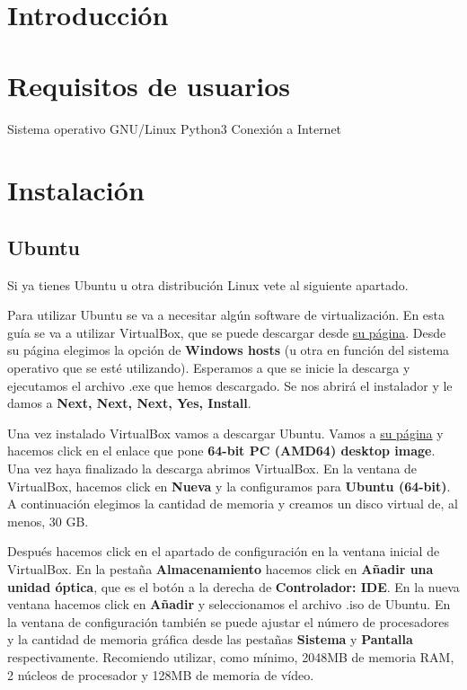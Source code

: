 
\section{Introducción}

\section{Requisitos de usuarios}

Sistema operativo GNU/Linux
Python3
Conexión a Internet

\section{Instalación}

\subsection{Ubuntu}

Si ya tienes Ubuntu u otra distribución Linux vete al siguiente apartado.

Para utilizar Ubuntu se va a necesitar algún software de virtualización. En esta guía se va a utilizar VirtualBox, que se puede descargar desde \href{https://www.virtualbox.org/wiki/Downloads}{su página}.
Desde su página elegimos la opción de \textbf{Windows hosts} (u otra en función del sistema operativo que se esté utilizando). Esperamos a que se inicie la descarga y ejecutamos el archivo .exe que hemos descargado. Se nos abrirá el instalador y le damos a \textbf{Next, Next, Next, Yes, Install}.

Una vez instalado VirtualBox vamos a descargar Ubuntu. Vamos a \href{https://releases.ubuntu.com/18.04.4/}{su página} y hacemos click en el enlace que pone \textbf{64-bit PC (AMD64) desktop image}. Una vez haya finalizado la descarga abrimos VirtualBox. En la ventana de VirtualBox, hacemos click en \textbf{Nueva} y la configuramos para \textbf{Ubuntu (64-bit)}. A continuación elegimos la cantidad de memoria y creamos un disco virtual de, al menos, 30 GB.

 

Después hacemos click en el apartado de configuración en la ventana inicial de VirtualBox. En la pestaña \textbf{Almacenamiento} hacemos click en \textbf{Añadir una unidad óptica}, que es el botón a la derecha de \textbf{Controlador: IDE}. En la nueva ventana hacemos click en \textbf{Añadir} y seleccionamos el archivo .iso de Ubuntu. En la ventana de configuración también se puede ajustar el número de procesadores y la cantidad de memoria gráfica desde las pestañas \textbf{Sistema} y \textbf{Pantalla} respectivamente. Recomiendo utilizar, como mínimo, 2048MB de memoria RAM, 2 núcleos de procesador y 128MB de memoria de vídeo.

